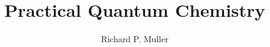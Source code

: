 \documentclass{report}
\begin{document}
\title{Practical Quantum Chemistry}
\author{Richard P. Muller}
\maketitle

\tableofcontents


















\appendix




\end{document}
